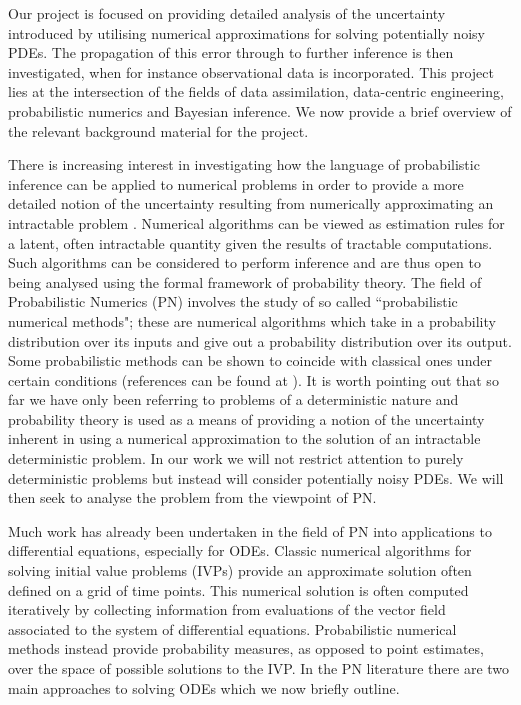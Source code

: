 Our project is focused on providing detailed analysis of the uncertainty introduced by utilising numerical approximations for solving potentially noisy PDEs. The propagation of this error through to further inference is then investigated, when for instance observational data is incorporated. This project lies at the intersection of the fields of data assimilation, data-centric engineering, probabilistic numerics and Bayesian inference. We now provide a brief overview of the relevant background material for the project.

There is increasing interest in investigating how the language of probabilistic inference can be applied to numerical problems in order to provide a more detailed notion of the uncertainty resulting from numerically approximating an intractable problem \textcolor{blue}{\citep{diaconis1988bayesian,o1992bayesian,skilling1992bayesian,hennig2015probabilistic}}. Numerical algorithms can be viewed as estimation rules for a latent, often intractable quantity given the results of tractable computations. Such algorithms can be considered to perform inference and are thus open to being analysed using the formal framework of probability theory. The field of Probabilistic Numerics (PN) \textcolor{blue}{\citep{probNumericsSite}} involves the study of so called ``probabilistic numerical methods"; these are numerical algorithms which take in a probability distribution over its inputs and give out a probability distribution over its output. Some probabilistic methods can be shown to coincide with classical ones under certain conditions (references can be found at \textcolor{blue}{\citep{probNumericsSite}}). It is worth pointing out that so far we have only been referring to problems of a deterministic nature and probability theory is used as a means of providing a notion of the uncertainty inherent in using a numerical approximation to the solution of an intractable deterministic problem. In our work we will not restrict attention to purely deterministic problems but instead will consider potentially noisy PDEs. We will then seek to analyse the problem from the viewpoint of PN.

Much work has already been undertaken in the field of PN into applications to differential equations, especially for ODEs. Classic numerical algorithms for solving initial value problems (IVPs) provide an approximate solution often defined on a grid of time points. This numerical solution is often computed iteratively by collecting information from evaluations of the vector field associated to the system of differential equations. Probabilistic numerical methods instead provide probability measures, as opposed to point estimates, over the space of possible solutions to the IVP. In the PN literature there are two main approaches to solving ODEs which we now briefly outline.

